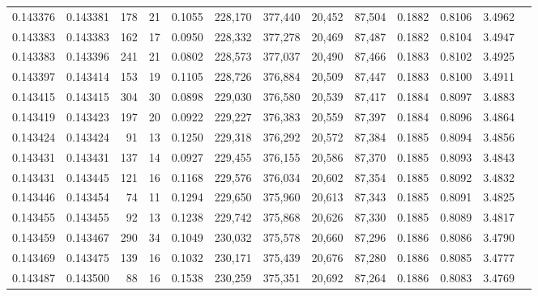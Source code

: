 \begin{tabular}{rrrrrrrrrrrrr}
0.143376 & 0.143381 &   178 &  21 &                                     0.1055 & 228,170 & 377,440 &  20,452 &  87,504 & 0.1882 & 0.8106 & 3.4962 \\
0.143383 & 0.143383 &   162 &  17 &                                     0.0950 & 228,332 & 377,278 &  20,469 &  87,487 & 0.1882 & 0.8104 & 3.4947 \\
0.143383 & 0.143396 &   241 &  21 &                                     0.0802 & 228,573 & 377,037 &  20,490 &  87,466 & 0.1883 & 0.8102 & 3.4925 \\
0.143397 & 0.143414 &   153 &  19 &                                     0.1105 & 228,726 & 376,884 &  20,509 &  87,447 & 0.1883 & 0.8100 & 3.4911 \\
0.143415 & 0.143415 &   304 &  30 &                                     0.0898 & 229,030 & 376,580 &  20,539 &  87,417 & 0.1884 & 0.8097 & 3.4883 \\
0.143419 & 0.143423 &   197 &  20 &                                     0.0922 & 229,227 & 376,383 &  20,559 &  87,397 & 0.1884 & 0.8096 & 3.4864 \\
0.143424 & 0.143424 &    91 &  13 &                                     0.1250 & 229,318 & 376,292 &  20,572 &  87,384 & 0.1885 & 0.8094 & 3.4856 \\
0.143431 & 0.143431 &   137 &  14 &                                     0.0927 & 229,455 & 376,155 &  20,586 &  87,370 & 0.1885 & 0.8093 & 3.4843 \\
0.143431 & 0.143445 &   121 &  16 &                                     0.1168 & 229,576 & 376,034 &  20,602 &  87,354 & 0.1885 & 0.8092 & 3.4832 \\
0.143446 & 0.143454 &    74 &  11 &                                     0.1294 & 229,650 & 375,960 &  20,613 &  87,343 & 0.1885 & 0.8091 & 3.4825 \\
0.143455 & 0.143455 &    92 &  13 &                                     0.1238 & 229,742 & 375,868 &  20,626 &  87,330 & 0.1885 & 0.8089 & 3.4817 \\
0.143459 & 0.143467 &   290 &  34 &                                     0.1049 & 230,032 & 375,578 &  20,660 &  87,296 & 0.1886 & 0.8086 & 3.4790 \\
0.143469 & 0.143475 &   139 &  16 &                                     0.1032 & 230,171 & 375,439 &  20,676 &  87,280 & 0.1886 & 0.8085 & 3.4777 \\
0.143487 & 0.143500 &    88 &  16 &                                     0.1538 & 230,259 & 375,351 &  20,692 &  87,264 & 0.1886 & 0.8083 & 3.4769 \\

\end{tabular}
